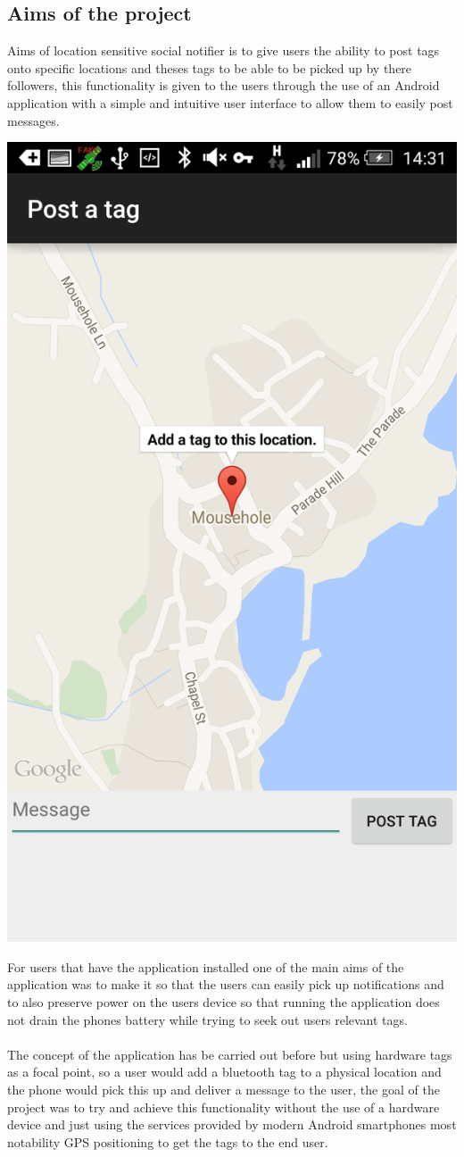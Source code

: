 \documentclass[a0,landscape]{a0poster}
\begin{document}
\begin{multicols}{5}
\color{Black}
\section{Aims of the project}

Aims of location sensitive social notifier is to give users the ability to post tags onto specific locations and theses tags to be able to be picked up by there followers, this functionality is given to the users through the use of an Android application with a simple and intuitive user interface to allow them to easily post messages.\\

\begin{center}
\includegraphics[width=0.39\linewidth]{posting}
\end{center}

For users that have the application installed one of the main aims of the application was to make it so that the users can easily pick up notifications and to also preserve power on the users device so that running the application does not drain the phones battery while trying to seek out users relevant tags.\\
\\
The concept of the application has be carried out before but using hardware tags as a focal point, so a user would add a bluetooth tag to a physical location and the phone would pick this up and deliver a message to the user, the goal of the project was to try and achieve this functionality without the use of a hardware device and just using the services provided by modern Android smartphones most notability GPS positioning to get the tags to the end user.


\end{multicols}
\end{document}
